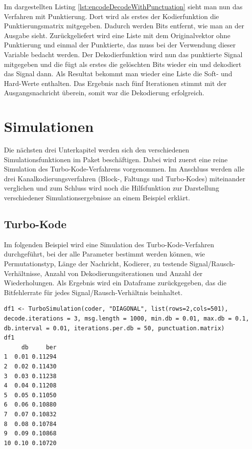 Im dargestellten Listing \ref{lst:encodeDecodeWithPunctuation} sieht man nun das Verfahren mit Punktierung. Dort wird als erstes der Kodierfunktion die Punktierungsmatrix mitgegeben. Dadurch werden Bits entfernt, wie man an der Ausgabe sieht. Zurückgeliefert wird eine Liste mit dem Originalvektor ohne Punktierung und einmal der Punktierte, das muss bei der Verwendung dieser Variable bedacht werden. Der Dekodierfunktion wird nun das punktierte Signal mitgegeben und die fügt als erstes die gelöschten Bits wieder ein und dekodiert das Signal dann. Als Resultat bekommt man wieder eine Liste die Soft- und Hard-Werte enthalten. Das Ergebnis nach fünf Iterationen stimmt mit der Ausgangsnachricht überein, somit war die Dekodierung erfolgreich.

\section{Simulationen}
\label{sec:example_simulations}

Die nächsten drei Unterkapitel werden sich den verschiedenen Simulationsfunktionen im Paket beschäftigen. Dabei wird zuerst eine reine Simulation des Turbo-Kode-Verfahrens vorgenommen. Im Anschluss werden alle drei Kanalkodierungsverfahren (Block-, Faltungs und Turbo-Kodes) miteinander verglichen und zum Schluss wird noch die Hilfsfunktion zur Darstellung verschiedener Simulationsergebnisse an einem Beispiel erklärt.

\subsection{Turbo-Kode}
\label{sec:example_simulations_turbo}

Im folgenden Beispiel wird eine Simulation des Turbo-Kode-Verfahren durchgeführt, bei der alle Parameter bestimmt werden können, wie Permutationstyp, Länge der Nachricht, Kodierer, zu testende Signal/Rausch-Verhältnisse, Anzahl von Dekodierungsiterationen und Anzahl der Wiederholungen. Als Ergebnis wird ein Dataframe zurückgegeben, das die Bitfehlerrate für jedes Signal/Rausch-Verhältnis beinhaltet.

\begin{lstlisting}[caption=Turbo-Kode-Simulation, label={lst:turboCodeSimulation}, float=!ht]
df1 <- TurboSimulation(coder, "DIAGONAL", list(rows=2,cols=501), decode.iterations = 3, msg.length = 1000, min.db = 0.01, max.db = 0.1, db.interval = 0.01, iterations.per.db = 50, punctuation.matrix)
df1
     db     ber
1  0.01 0.11294
2  0.02 0.11430
3  0.03 0.11238
4  0.04 0.11208
5  0.05 0.11050
6  0.06 0.10880
7  0.07 0.10832
8  0.08 0.10784
9  0.09 0.10868
10 0.10 0.10720
\end{lstlisting}

